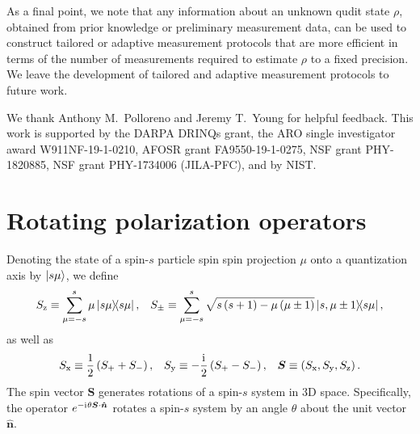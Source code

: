 \documentclass[nofootinbib,twocolumn]{revtex4-1}
\newcommand{\f}[2]{\dfrac{#1}{#2}} %
\newcommand{\p}[1]{\left(#1\right)} %
\newcommand{\uv}[1]{\bm{\hat{#1}}} %
\renewcommand{\i}{\mathrm{i}\mkern1mu} %
\newcommand{\x}{\text{x}}
\newcommand{\y}{\text{y}}
\newcommand{\z}{\text{z}}
\begin{document}
As a final point, we note that any information about an unknown qudit state $\rho$, obtained from prior knowledge or preliminary measurement data, can be used to construct tailored or adaptive measurement protocols \cite{huszar2012adaptive, ferrie2014selfguided, granade2016practical, pereira2018adaptive} that are more efficient in terms of the number of measurements required to estimate $\rho$ to a fixed precision.
We leave the development of tailored and adaptive measurement protocols to future work.

\begin{acknowledgments}
We thank Anthony M.~Polloreno and Jeremy T.~Young for helpful feedback.
This work is supported  by the DARPA DRINQs grant, the ARO single investigator award W911NF-19-1-0210, AFOSR grant FA9550-19-1-0275, NSF grant PHY-1820885, NSF grant PHY-1734006 (JILA-PFC), and by NIST.
\end{acknowledgments}


\onecolumngrid
\newpage
\appendix

\section{Rotating polarization operators}
\label{sec:rotations}

Denoting the state of a spin-$s$ particle spin spin projection $\mu$ onto a quantization axis by $\ket{s\mu}$, we define
\begin{align}
  S_\z \equiv \sum_{\mu=-s}^s \mu \op{s\mu},
  &&
  S_\pm \equiv \sum_{\mu=-s}^s
  \sqrt{s\p{s+1}-\mu\p{\mu\pm1}} \op{s,\mu\pm1}{s\mu},
  \label{eq:spin_ops}
\end{align}
as well as
\begin{align}
  S_\x \equiv \f12\p{S_+ + S_-},
  &&
  S_\y \equiv -\f\i2\p{S_+-S_-},
  &&
  \bm S \equiv \p{S_\x,S_\y,S_\z}.
\end{align}
The spin vector $\bm S$ generates rotations of a spin-$s$ system in 3D space.
Specifically, the operator $e^{-\i\theta\bm S\cdot\uv n}$ rotates a spin-$s$ system by an angle $\theta$ about the unit vector $\uv n$.
\end{document}
